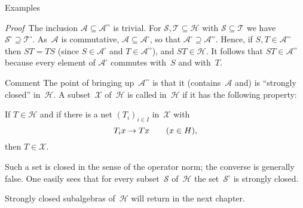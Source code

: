 \documentclass[main.tex]{subfiles}
\begin{document}
\begin{psec}{5.16}{Examples}
\begin{enumerate}
\emph{Proof}\  The inclusion 
$\mathscr{A}\subseteq{\mathscr{A}}^{\square\square}$ is trivial.
For $\mathscr{S},\mathscr{T}\subseteq\mathscr H$
with $\mathscr{S}\subseteq\mathscr{T}$
we have ${\mathscr S}^\square\supseteq{\mathscr T}^\square$.
As~$\mathscr{A}$ is commutative,
$\mathscr A\subseteq {\mathscr A}^\square$,
so that ${\mathscr A}^\square \supseteq {\mathscr A}^{\square\square}$.
Hence, if $S,T\in{\mathscr A}^{\square\square}$
then $ST=TS$
(since $S\in{\mathscr A}^\square$ and $T\in{\mathscr A}^{\square\square}$),
and $ST\in\mathscr H$.
It follows that $ST\in{\mathscr A}^{\square\square}$
because every element of ${\mathscr A}^\square$
commutes with~$S$ and with~$T$.
\end{enumerate}
\end{psec}
%
%
\begin{psec}{5.17}{Comment}
The point of bringing up~${\mathscr A}^{\square\square}$
is that it (contains~$\mathscr A$ and) is
``strongly closed'' in~$\mathscr H$.
A subset~$\mathscr X$ of~$\mathscr H$ is called
 in~$\mathscr H$
if it has the following property:
\vspace{.5em}
\begin{center}
\begin{minipage}{.30\textwidth}
If $T\in\mathscr H$ and if there is a net
$(T_i)_{i\in I}$ in~$\mathscr X$ with
\begin{equation*}
T_i x \rightarrow T x\qquad (x\in H)\text{,}
\end{equation*}
then $T\in\mathscr X$.
\end{minipage}
\end{center}
\vspace{.5em}
Such a set is closed in the sense of the operator norm;
the converse is generally false.
One easily sees that for every subset~$\mathscr S$
of~$\mathscr H$ the set~${\mathscr S}^\square$ is strongly closed.

Strongly closed subalgebras of~$\mathscr H$
will return in the next chapter.
\end{psec}
\end{document}
